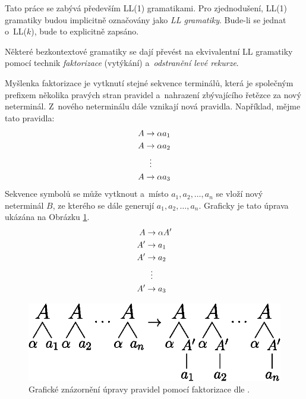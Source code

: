 \begin{convention}
    Tato práce se zabývá především LL(1) gramatikami.
    Pro zjednodušení, LL(1) gramatiky budou implicitně označovány jako \emph{LL gramatiky}.
    Bude-li se jednat o~LL($k$), bude to explicitně zapsáno.
\end{convention}

Některé bezkontextové gramatiky se dají převést na ekvivalentní LL gramatiky pomocí technik \emph{faktorizace} (vytýkání) a~\emph{odstranění levé rekurze}.

Myšlenka faktorizace je vytknutí stejné sekvence terminálů, která je společným prefixem několika pravých stran pravidel a~nahrazení zbývajícího řetězce za nový neterminál.
Z~nového neterminálu dále vznikají nová pravidla.
Například, mějme tato pravidla:
\begin{align*}
    A &\rightarrow \alpha a_1\\
    A &\rightarrow \alpha a_2\\
      &\vdotswithin{\rightarrow} \\
    A &\rightarrow \alpha a_3
\end{align*}
Sekvence symbolů se může vytknout a~místo $a_1, a_2, \ldots, a_n$ se vloží nový neterminál $B$, ze kterého se dále generují $a_1, a_2, \ldots, a_n$.
Graficky je tato úprava ukázána na Obrázku \ref{fig_faktorizace}.
\begin{align*}
    A &\rightarrow \alpha A'\\
    A' &\rightarrow a_1\\
    A' &\rightarrow a_2\\
       &\vdotswithin{\rightarrow}\\
    A' &\rightarrow a_3
\end{align*}

\begin{figure}
    \centering
    \includegraphics{obrazky-figures/faktorizace.eps}
    \caption{Grafické znázornění úpravy pravidel pomocí faktorizace dle \cite{meduna2017sa-shora-dolu}.}
    \label{fig_faktorizace}
\end{figure}


